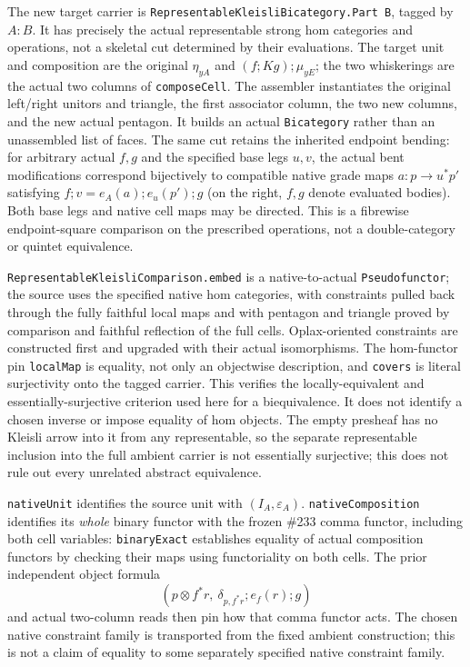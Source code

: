 \documentclass[11pt]{article}
\newcommand{\nm}[1]{\nolinkurl{#1}}
\begin{document}
The new target carrier is \nm{RepresentableKleisliBicategory.Part B},
tagged by $A:B$. It has precisely the actual representable strong hom
categories and operations, not a skeletal cut determined by their
evaluations. The target unit and composition are the original
$\eta_{yA}$ and $(f;Kg);\mu_{yE}$; the two whiskerings are the
actual two columns of \nm{composeCell}. The assembler instantiates
the original left/right unitors and triangle, the first associator
column, the two new columns, and the new actual pentagon.
It builds an actual \nm{Bicategory} rather than an unassembled list of
faces. The same cut retains the inherited endpoint bending:
for arbitrary actual $f,g$ and the specified base legs $u,v$, the
actual bent modifications correspond bijectively to compatible native
grade maps $a:p\to u^*p'$ satisfying $f;v=e_A(a);e_u(p');g$
(on the right, $f,g$ denote evaluated bodies). Both base legs and
native cell maps may be directed. This is a fibrewise endpoint-square
comparison on the prescribed operations, not a double-category or
quintet equivalence.

\nm{RepresentableKleisliComparison.embed} is a native-to-actual
\nm{Pseudofunctor}; the source uses the specified native hom categories,
with constraints pulled back through the fully faithful local maps
and with pentagon and triangle proved by comparison and faithful
reflection of the full cells. Oplax-oriented constraints are
constructed first and upgraded with their actual isomorphisms.
The hom-functor pin \nm{localMap} is equality, not only an objectwise
description, and \nm{covers} is literal surjectivity onto the tagged
carrier. This verifies the locally-equivalent and essentially-surjective
criterion used here for a biequivalence. It does not identify a chosen
inverse or impose equality of hom objects. The empty presheaf has no
Kleisli arrow into it from any representable, so the separate
representable inclusion into the full ambient carrier is not essentially
surjective; this does not rule out every unrelated abstract equivalence.

\nm{nativeUnit} identifies the source unit with $(I_A,\varepsilon_A)$.
\nm{nativeComposition} identifies its \emph{whole} binary functor
with the frozen \#233 comma functor, including both cell variables:
\nm{binaryExact} establishes equality of actual composition functors
by checking their maps using functoriality on both cells. The prior
independent object formula
\[
  \left(p\otimes f^*r,\ \delta_{p,f^*r};e_f(r);g\right)
\]
and actual two-column reads then pin how that comma functor acts.
The chosen native constraint family is transported from the fixed
ambient construction; this is not a claim of equality to some separately
specified native constraint family.
\end{document}
